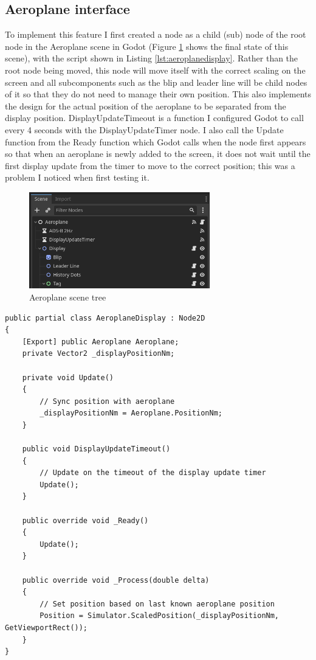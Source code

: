 \documentclass{article}
\begin{document}
\subsection{Aeroplane interface}
To implement this feature I first created a node as a child (sub) node of the root node in the Aeroplane scene in Godot (Figure \ref{fig:scenetree} shows the final state of this scene), with the script shown in Listing \ref{lst:aeroplanedisplay}.
Rather than the root node being moved, this node will move itself with the correct scaling on the screen and all subcomponents such as the blip and leader line will be child nodes of it so that they do not need to manage their own position.
This also implements the design for the actual position of the aeroplane to be separated from the display position.
DisplayUpdateTimeout is a function I configured Godot to call every 4 seconds with the DisplayUpdateTimer node.
I also call the Update function from the Ready function which Godot calls when the node first appears so that when an aeroplane is newly added to the screen, it does not wait until the first display update from the timer to move to the correct position; this was a problem I noticed when first testing it.
\begin{figure}[H]
\centering
\includegraphics[width=0.7\textwidth]{screenshots/tree.png}
\caption{\label{fig:scenetree}Aeroplane scene tree}
\end{figure}
\lstset{style=csharp}
\begin{lstlisting}[label={lst:aeroplanedisplay},caption=Aeroplane display script]
public partial class AeroplaneDisplay : Node2D
{
    [Export] public Aeroplane Aeroplane;
    private Vector2 _displayPositionNm;

    private void Update()
    {
        // Sync position with aeroplane
        _displayPositionNm = Aeroplane.PositionNm;
    }

    public void DisplayUpdateTimeout()
    {
        // Update on the timeout of the display update timer
        Update();
    }

    public override void _Ready()
    {
        Update();
    }

    public override void _Process(double delta)
    {
        // Set position based on last known aeroplane position
        Position = Simulator.ScaledPosition(_displayPositionNm, GetViewportRect());
    }
}
\end{lstlisting}
\end{document}
